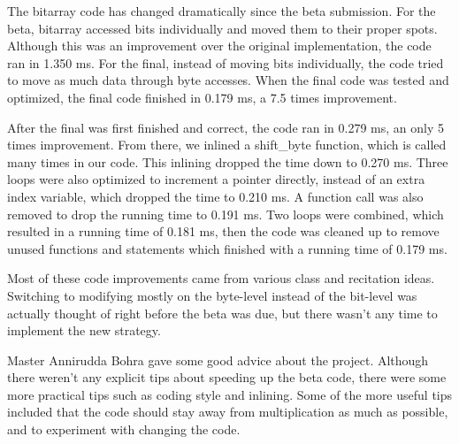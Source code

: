 \documentclass[12pt]{article}
\begin{document}
\maketitle

The bitarray code has changed dramatically since the beta submission.  For the 
beta, bitarray accessed bits individually and moved them to their proper spots.  
Although this was an improvement over the original implementation, the code ran
in 1.350 ms.  For the final, instead of moving bits individually, the code tried 
to move as much data through byte accesses.  When the final code was tested and 
optimized, 
the final code finished in 0.179 ms, a 7.5 times improvement.  

After the final was first finished and correct, the code ran in 0.279 ms, an 
only 5 times improvement.  From there, we inlined a shift\_byte function, which is 
called many times in our code.  This inlining dropped the time down to 0.270 ms.  
Three loops were also optimized to increment a pointer directly, instead of an extra
index variable, which dropped the time to 0.210 ms.  A function call was also 
removed to drop the running time to 0.191 ms.  Two loops were combined, which 
resulted in a running time of 0.181 ms, then the code was cleaned up to remove
unused functions and statements which finished with a running time of 0.179 ms.  

Most of these code improvements came from various class and recitation ideas.  
Switching to modifying mostly on the byte-level instead of the bit-level was actually 
thought of right before the beta was due, but there wasn't any time to implement 
the new strategy.  

Master Annirudda Bohra gave some good advice about the project.  Although there 
weren't any explicit tips about speeding up the beta code, there were some 
more practical tips such as coding style and inlining.  Some of the more useful 
tips included that the code should stay away from multiplication as much as possible, 
and to experiment with changing the code.  
\end{document}
